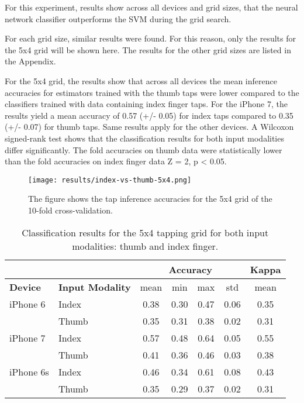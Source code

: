 For this experiment, results show across all devices and grid sizes, that the neural network classifier outperforms the SVM during the grid search.

For each grid size, similar results were found. For this reason, only the results for the 5x4 grid will be shown here. The results for the other grid sizes are listed in the Appendix. %

For the 5x4 grid, the results show that across all devices the mean inference accuracies for estimators trained with the thumb taps were lower compared to the classifiers trained with data containing index finger taps. For the iPhone 7, the results yield a mean accuracy of 0.57 (+/- 0.05) for index taps compared to 0.35 (+/- 0.07) for thumb taps. Same results apply for the other devices. A Wilcoxon signed-rank test shows that the classification results for both input modalities differ significantly. The fold accuracies on thumb data were statistically lower than the fold accuracies on index finger data Z = 2, p < 0.05.


\begin{figure}[h!]
  \centering
  \texttt{[image: results/index-vs-thumb-5x4.png]}
  \caption{The figure shows the tap inference accuracies for the 5x4 grid of the 10-fold cross-validation.} \label{fig:participation}
\end{figure}

\begin{table}[h!]
  \centering
\begin{tabular}{|l|l|c|c|c|c|c|}
  \cline{3-7}
  \multicolumn{2}{c}{} & \multicolumn{4}{|c|}{\textbf{Accuracy}} & \textbf{Kappa} \\
  \hline
  \textbf{Device} & \textbf{Input Modality} & mean &   min &   max  & std &  mean \\
  \hline
  iPhone 6 & Index &      0.38 &     0.30 &     0.47 &     0.06 &        0.35 \\
  & Thumb &      0.35 &     0.31 &     0.38 &     0.02 &        0.31 \\
  \hline
iPhone 7 & Index &      0.57 &     0.48 &     0.64 &     0.05 &        0.55 \\
  & Thumb &      0.41 &     0.36 &     0.46 &     0.03 &        0.38 \\
  \hline
iPhone 6s & Index &      0.46 &     0.34 &     0.61 &     0.08 &        0.43 \\
  & Thumb &      0.35 &     0.29 &     0.37 &     0.02 &        0.31 \\
  \hline
\end{tabular}
  \caption{Classification results for the 5x4 tapping grid for both input modalities: thumb and index finger.}
\end{table}

